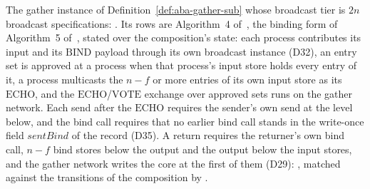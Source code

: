 \begin{definition}
  \label{def:aba-gather-ideal}
  \leanok
  The gather instance of Definition~\ref{def:aba-gather-sub} whose broadcast tier is $2n$ broadcast specifications: .
  Its rows are Algorithm~4 of~\cite{LeslieBP}, the binding form of Algorithm~5 of~\cite{AFW25}, stated over the composition's state: each process contributes its input and its $\mathrm{BIND}$ payload through its own broadcast instance (D32), an entry set is approved at a process when that process's input store holds every entry of it, a process multicasts the $n{-}f$ or more entries of its own input store as its $\mathrm{ECHO}$, and the $\mathrm{ECHO}$/$\mathrm{VOTE}$ exchange over approved sets runs on the gather network.
  Each send after the $\mathrm{ECHO}$ requires the sender's own send at the level below, and the bind call requires that no earlier bind call stands in the write-once field $\mathit{sentBind}$ of the record (D35).
  A return requires the returner's own bind call, $n{-}f$ bind stores below the output and the output below the input stores, and the gather network writes the core at the first of them (D29): , matched against the transitions of the composition by .
\end{definition}
